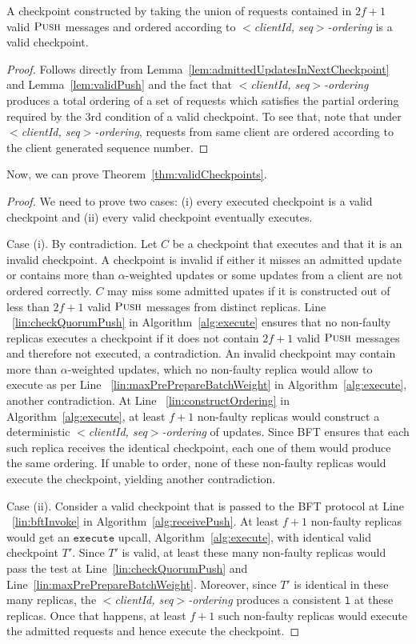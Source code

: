 \documentclass[twocolumn,10pt]{article}
\begin{document}
{\begin{lemma}
A checkpoint constructed by taking the union of requests contained 
in $2f+1$ valid $\textsc{Push}$ messages and ordered according to \emph{$<$clientId, seq$>$-ordering}
is a valid checkpoint.
\end{lemma}
\begin{proof}
Follows directly from Lemma~\ref{lem:admittedUpdatesInNextCheckpoint} and 
Lemma~\ref{lem:validPush} and the fact that \emph{$<$clientId, seq$>$-ordering} 
produces a total ordering of a set of requests which satisfies the partial ordering
required by the 3rd condition of a valid checkpoint. To see that, note that under 
\emph{$<$clientId, seq$>$-ordering}, requests from same client are ordered according
to the client generated sequence number. 
\end{proof}

Now, we can prove  Theorem~\ref{thm:validCheckpoints}.

\begin{proof}
We need to prove two cases: (i)
every executed checkpoint is a valid checkpoint and (ii) every valid checkpoint
eventually executes.

Case (i). By contradiction. Let $C$ be a checkpoint that executes and
that it is an invalid checkpoint. 
A checkpoint is invalid if either it misses an admitted update or 
contains more than $\alpha$-weighted updates or some updates from a client are not
ordered correctly. $C$ may miss some admitted upates if it is constructed out of
less than $2f+1$ valid $\textsc{Push}$ messages from distinct replicas. Line ~\ref{lin:checkQuorumPush}
in 
Algorithm~\ref{alg:execute} ensures that no non-faulty replicas executes a checkpoint if 
it does not contain $2f+1$ valid $\textsc{Push}$ messages and therefore not executed, 
a contradiction. An invalid checkpoint may contain more than $\alpha$-weighted updates, 
which no non-faulty replica would allow to execute as per Line
~\ref{lin:maxPrePrepareBatchWeight} in Algorithm~\ref{alg:execute}, another contradiction. 
At Line ~\ref{lin:constructOrdering} in 
Algorithm~\ref{alg:execute}, at least $f+1$ non-faulty replicas would construct a deterministic 
\emph{$<$clientId, seq$>$-ordering} of updates. Since BFT ensures that each such replica receives the identical 
checkpoint, each one of them would produce the same ordering. If unable to order, 
none of these non-faulty replicas would execute the checkpoint, yielding another contradiction.



Case (ii). Consider a valid checkpoint that is passed to the BFT protocol at Line 
~\ref{lin:bftInvoke} in Algorithm~\ref{alg:receivePush}. 
At least $f+1$ non-faulty replicas would get an $\mathtt{execute}$ 
upcall, Algorithm~\ref{alg:execute}, with identical valid checkpoint $T'$. Since $T'$ is valid, at 
least these many non-faulty replicas would pass the test at Line~\ref{lin:checkQuorumPush} 
and Line~\ref{lin:maxPrePrepareBatchWeight}. 
Moreover, since $T'$ is identical in these many replicas, the \emph{$<$clientId, seq$>$-ordering} produces 
a consistent $\mathtt{l}$ at these replicas. Once that happens, at least $f+1$ such non-faulty 
replicas would execute the admitted requests and hence execute the checkpoint. 


\end{proof}}
\end{document}
